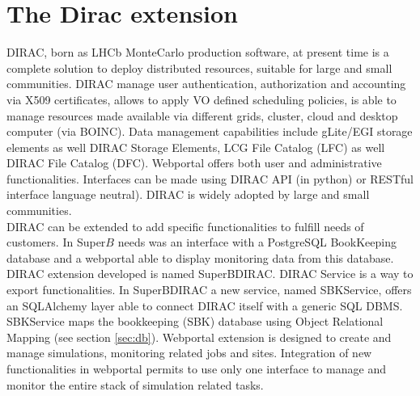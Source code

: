 \documentclass[a4paper]{jpconf}
\begin{document}
 
\section{The Dirac extension} 
DIRAC, born as LHCb MonteCarlo production software, at present time is a complete solution to deploy distributed resources, suitable for large and small communities. DIRAC manage user authentication, authorization and accounting via X509 certificates, allows to apply VO defined scheduling policies, is able to manage resources made available via different grids, cluster, cloud and desktop computer (via BOINC). Data management capabilities include gLite/EGI storage elements as well DIRAC Storage Elements, LCG File Catalog (LFC) as well DIRAC File Catalog (DFC). Webportal offers both user and administrative functionalities. Interfaces can be made using DIRAC API (in python) or RESTful interface language neutral). DIRAC is widely adopted by large and small communities.\\
DIRAC can be extended to add specific functionalities to fulfill needs of customers. In Super$B$ needs was an interface with a PostgreSQL BookKeeping database and a webportal able to display monitoring data from this database. DIRAC extension developed is named SuperBDIRAC.
DIRAC Service is a way to export functionalities. In SuperBDIRAC a new service, named SBKService, offers an SQLAlchemy layer able to connect DIRAC itself with a generic SQL DBMS. SBKService maps the bookkeeping (SBK) database using Object Relational Mapping (see section \ref{sec:db}). 
Webportal extension is designed to create and manage simulations, monitoring related jobs and sites. Integration of new functionalities in webportal permits to use only one interface to manage and monitor the entire stack of simulation related tasks.
\end{document}
